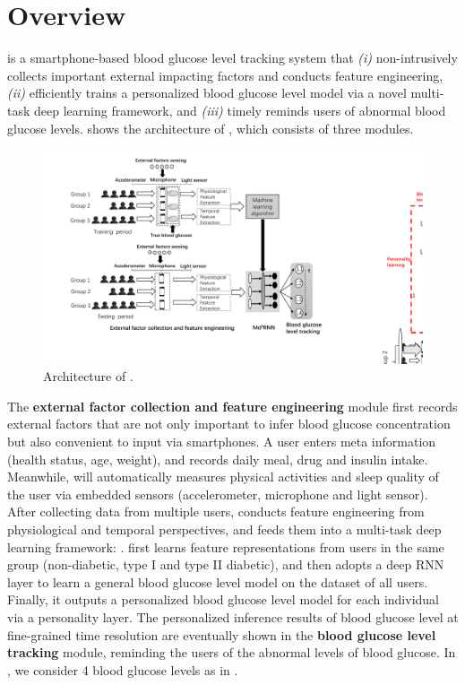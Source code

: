 
\section{Overview}
\label{sec:overview}
\sysname is a smartphone-based blood glucose level tracking system that \emph{(i)} non-intrusively collects important external impacting factors and conducts feature engineering, \emph{(ii)} efficiently trains a personalized blood glucose level model via a novel multi-task deep learning framework, and \emph{(iii)} timely reminds users of abnormal blood glucose levels.
 shows the architecture of \sysname, which consists of three modules.

\begin{figure}[h]
  \centering
  \includegraphics[width=0.85\columnwidth]{./img/System_Arch2.pdf}
  \caption{Architecture of \sysname.}
  \label{fig:architecture}
\end{figure}


The \textbf{external factor collection and feature engineering} module first records external factors that are not only important to infer blood glucose concentration but also convenient to input via smartphones. A user enters meta information (\eg health status, age, weight), and records daily meal, drug and insulin intake.
Meanwhile, \sysname will automatically measures physical activities and sleep quality of the user via embedded sensors (\ie accelerometer, microphone and light sensor). After collecting data from multiple users, \sysname conducts feature engineering from physiological and temporal perspectives, and feeds them into a multi-task deep learning framework: \textbf{\modelname}.
\modelname first learns feature representations from users in the same group (non-diabetic, type I and type II diabetic), and then adopts a deep RNN layer to learn a general blood glucose level model on the dataset of all users.
Finally, it outputs a personalized blood glucose level model for each individual via a personality layer. The personalized inference results of blood glucose level at fine-grained time resolution are eventually shown in the \textbf{blood glucose level tracking} module, reminding the users of the abnormal levels of blood glucose.
In \sysname, we consider 4 blood glucose levels as in .

